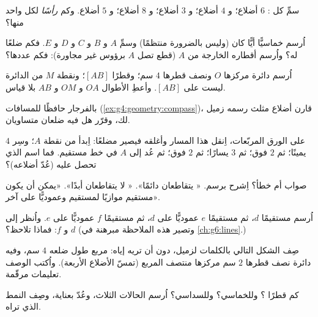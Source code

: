 \begin{exercise}[$\star$]\label{exo:g4:geometry:3}
سمِّ كل : $6$ أضلاع؛ و $4$ أضلاع؛ و $3$ أضلاع؛ و $8$ أضلاع؛
و $5$ أضلاع. وكم \emph{رأسًا} لكل واحد منها؟
\end{exercise}

\begin{exercise}[$\star$]\label{exo:g4:geometry:4}
اُرسم خماسيًّا أيًّا كان (وليس بالضرورة منتظمًا) وسمِّ 
$A$ و $B$ و $C$ و $D$ و $E$. فكم ضلعًا له؟ واُرسم أقطاره
الخارجة من $A$ (قطع تصل $A$ برؤوس غير مجاورة):
فكم عددها؟
\end{exercise}

\begin{exercise}[$\star$]\label{exo:g4:geometry:5}
اُرسم دائرة مركزها $O$ ونصف قطرها $4$ سم؛ وقطرًا $[AB]$؛
ونقطة $M$ من الدائرة ليست على $[AB]$. وأعطِ الأطوال $OA$
و $OM$ و $AB$ بلا قياس.
\end{exercise}

\begin{exercise}[$\star$]\label{exo:g4:geometry:6}
بالفرجار حافظًا للمسافات
(\cref{ex:g4:geometry:compass})، قارن أضلاع مثلث رسمه زميل
لك، وقرّر هل فيه ضلعان متساويان.
\end{exercise}

\begin{exercise}[$\star$]\label{exo:g4:geometry:7}
على الورق المربّعات، اِنقل هذا المسار وأغلقه فيصير مضلعًا:
اِبدأ من نقطة $A$؛ وسِر $4$ يمينًا؛ ثم $2$ فوق؛ ثم $3$ يسارًا؛ ثم $2$ فوق؛
ثم عُد إلى $A$ في خط مستقيم. فما اسم 
الذي تحصل عليه (عُدّ أضلاعه)؟
\end{exercise}

\begin{exercise}[$\star$]\label{exo:g4:geometry:8}
صواب أم خطأ؟ اِشرح برسم.
« يتقاطعان دائمًا».
« لا يتقاطعان أبدًا».
«يمكن أن يكون مستقيم موازيًا لمستقيم وعموديًّا على
آخر».
\end{exercise}

\begin{exercise}[$\star\star$]\label{exo:g4:geometry:9}
اُرسم مستقيمًا $d$، ثم مستقيمًا $e$ عموديًّا على $d$، ثم مستقيمًا
$f$ عموديًّا على $e$. واُنظر إلى $d$ و $f$: فماذا تلاحظ؟
(وتصير هذه الملاحظة مبرهنة في \cref{ch:g6:lines}.)
\end{exercise}

\begin{exercise}[$\star\star$]\label{exo:g4:geometry:10}
صِف الشكل التالي بالكلمات لزميل، دون أن تريه
إياه: مربع طول ضلعه $4$ سم، وفيه دائرة نصف قطرها $2$ سم مركزها
منتصف المربع (تمسّ الأضلاع الأربعة). واُكتب الوصف
تعليمات مرقّمة.
\end{exercise}

\begin{exercise}[$\star\star$]\label{exo:g4:geometry:11}
كم قطرًا ؟ وللخماسي؟ وللسداسي؟
اُرسم الحالات الثلاث، وعُدّ بعناية، وصِف النمط الذي
تراه.
\end{exercise}
